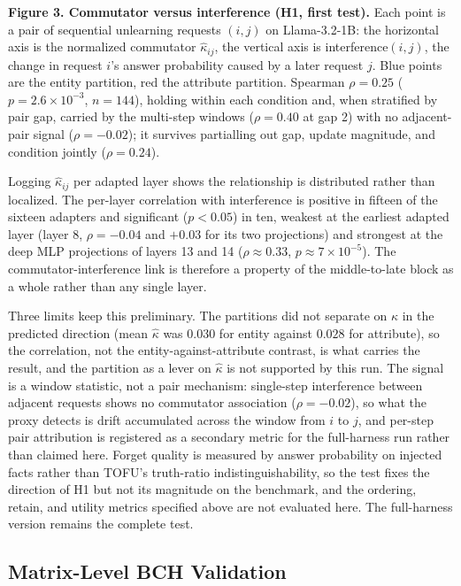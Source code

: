 \documentclass[
]{article}
\begin{document}
\textbf{Figure 3. Commutator versus interference (H1, first test).} Each point is a pair of sequential unlearning requests \((i,j)\) on Llama-3.2-1B: the horizontal axis is the normalized commutator \(\hat\kappa_{ij}\), the vertical axis is interference\((i,j)\), the change in request \(i\)'s answer probability caused by a later request \(j\). Blue points are the entity partition, red the attribute partition. Spearman \(\rho=0.25\) (\(p=2.6\times10^{-3}\), \(n=144\)), holding within each condition and, when stratified by pair gap, carried by the multi-step windows (\(\rho=0.40\) at gap 2) with no adjacent-pair signal (\(\rho=-0.02\)); it survives partialling out gap, update magnitude, and condition jointly (\(\rho=0.24\)).

Logging \(\hat\kappa_{ij}\) per adapted layer shows the relationship is distributed rather than localized. The per-layer correlation with interference is positive in fifteen of the sixteen adapters and significant (\(p<0.05\)) in ten, weakest at the earliest adapted layer (layer 8, \(\rho=-0.04\) and \(+0.03\) for its two projections) and strongest at the deep MLP projections of layers 13 and 14 (\(\rho\approx0.33\), \(p\approx7\times10^{-5}\)). The commutator-interference link is therefore a property of the middle-to-late block as a whole rather than any single layer.

Three limits keep this preliminary. The partitions did not separate on \(\hat\kappa\) in the predicted direction (mean \(\hat\kappa\) was \(0.030\) for entity against \(0.028\) for attribute), so the correlation, not the entity-against-attribute contrast, is what carries the result, and the partition as a lever on \(\hat\kappa\) is not supported by this run. The signal is a window statistic, not a pair mechanism: single-step interference between adjacent requests shows no commutator association (\(\rho=-0.02\)), so what the proxy detects is drift accumulated across the window from \(i\) to \(j\), and per-step pair attribution is registered as a secondary metric for the full-harness run rather than claimed here. Forget quality is measured by answer probability on injected facts rather than TOFU's truth-ratio indistinguishability, so the test fixes the direction of H1 but not its magnitude on the benchmark, and the ordering, retain, and utility metrics specified above are not evaluated here. The full-harness version remains the complete test.

\subsection{Matrix-Level BCH Validation}\label{matrix-level-bch-validation}
\end{document}
